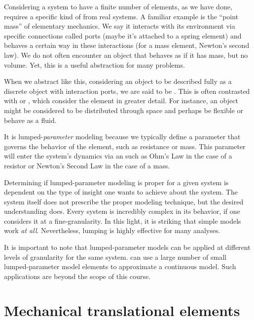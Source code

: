 \documentclass[dynamic_systems.tex]{subfiles}
\begin{document}
Considering a system to have a finite number of elements, as we have done, requires a specific kind of  from real systems.
A familiar example is the ``point mass'' of elementary mechanics.
We say it interacts with its environment via specific connections called ports (maybe it's attached to a spring element) and behaves a certain way in these interactions (for a mass element, Newton's second law).
We do not often encounter an object that behaves as if it has mass, but no volume.
Yet, this is a useful abstraction for many problems.
\tags{}

When we abstract like this, considering an object to be described fully as a discrete object with interaction ports, we are said to be .
This is often contrasted with  or , which consider the element in greater detail.
For instance, an object might be considered to be distributed through space and perhaps be flexible or behave as a fluid.
\tags{}

It is lumped-\emph{parameter} modeling because we typically define a parameter that governs the behavior of the element, such as resistance or mass. This parameter will enter the system's dynamics via an  such as Ohm's Law in the case of a resistor or Newton's Second Law in the case of a mass.

Determining if lumped-parameter modeling is proper for a given system is dependent on the type of insight one wants to achieve about the system.
The system itself does not prescribe the proper modeling technique, but the desired understanding does.
Every system is incredibly complex in its behavior, if one considers it at a fine-granularity.
In this light, it is striking that simple models work \emph{at all}.
Nevertheless, lumping is highly effective for many analyses.
\tags{}

It is important to note that lumped-parameter models can be applied at different levels of granularity for the same system.
 can use a large number of small lumped-parameter model elements to approximate a continuous model.
Such applications are beyond the scope of this course.
\tags{}

\section{Mechanical translational elements}
\tags{}
\end{document}
